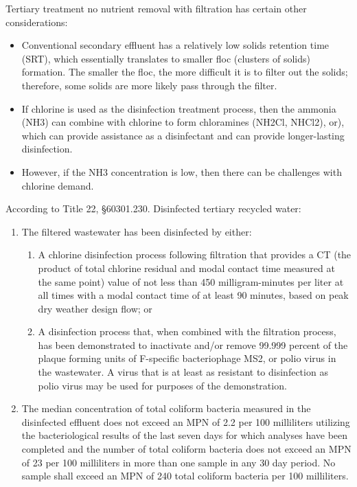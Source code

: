 \begin{enumerate}
Tertiary treatment no nutrient removal with filtration has certain other considerations:
\begin{itemize}
\item Conventional secondary effluent has a relatively low solids retention time (SRT), which essentially translates to smaller floc (clusters of solids) formation.  The smaller the floc, the more difficult it is to filter out the solids; therefore, some solids are more likely pass through the filter.
\item If chlorine is used as the disinfection treatment process, then the ammonia (NH3) can combine with chlorine to form chloramines (NH2Cl, NHCl2), or), which can provide assistance as a disinfectant and can provide longer-lasting disinfection.  
\item However, if the NH3 concentration is low, then there can be challenges with chlorine demand.
\end{itemize}
According to Title 22, §60301.230. Disinfected tertiary recycled water:
\begin{enumerate}
\item The filtered wastewater has been disinfected by either:
\begin{enumerate}
\item A chlorine disinfection process following filtration that provides a CT (the product of total chlorine residual and modal contact time measured at the same point) value of not less than 450 milligram-minutes per liter at all times with a modal contact time of at least 90 minutes, based on peak dry weather design flow; or
\item A disinfection process that, when combined with the filtration process, has been demonstrated to inactivate and/or remove 99.999 percent of the plaque forming units of F-specific bacteriophage MS2, or polio virus in the wastewater.  A virus that is at least as resistant to disinfection as polio virus may be used for purposes of the demonstration.
\end{enumerate}
\item The median concentration of total coliform bacteria measured in the disinfected effluent does not exceed an MPN of 2.2 per 100 milliliters utilizing the bacteriological results of the last seven days for which analyses have been completed and the number of total coliform bacteria does not exceed an MPN of 23 per 100 milliliters in more than one sample in any 30 day period.  No sample shall exceed an MPN of 240 total coliform bacteria per 100 milliliters.
\end{enumerate}

\end{enumerate}
